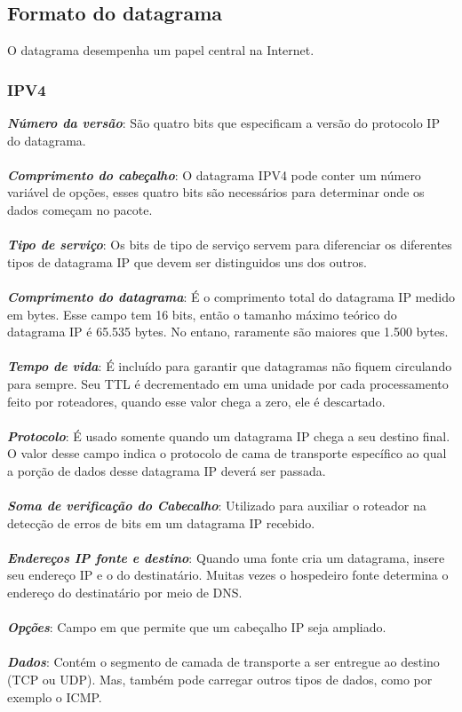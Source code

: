 \documentclass[a4paper, 12pt]{article}
\begin{document}
    \subsection{Formato do datagrama}
    O datagrama desempenha um papel central na Internet.

        \subsubsection{IPV4}
        \textbf{\textit{Número da versão}}: São quatro bits que especificam a versão do protocolo IP do datagrama.
        \\
        \\
        \textbf{\textit{Comprimento do cabeçalho}}: O datagrama IPV4 pode conter um número variável de opções, esses quatro bits
        são necessários para determinar onde os dados começam no pacote.
        \\
        \\
        \textbf{\textit{Tipo de serviço}}: Os bits de tipo de serviço servem para diferenciar os diferentes tipos de datagrama IP
        que devem ser distinguidos uns dos outros.
        \\
        \\
        \textbf{\textit{Comprimento do datagrama}}:
        É o comprimento total do datagrama IP medido em bytes. Esse campo tem 16 bits, então o tamanho máximo teórico do datagrama
        IP é 65.535 bytes. No entano, raramente são maiores que 1.500 bytes.
        \\
        \\
        \textbf{\textit{Tempo de vida}}: É incluído para garantir que datagramas não fiquem circulando para sempre. Seu TTL é 
        decrementado em uma unidade por cada processamento feito por roteadores, quando esse valor chega a zero, ele é descartado.
        \\
        \\
        \textbf{\textit{Protocolo}}: É usado somente quando um datagrama IP chega a seu destino final. O valor desse campo indica
        o protocolo de cama de transporte específico ao qual a porção de dados desse datagrama IP deverá ser passada.
        \\
        \\
        \textbf{\textit{Soma de verificação do Cabecalho}}: Utilizado para auxiliar o roteador na detecção de erros de bits em
        um datagrama IP recebido.
        \\
        \\
        \textbf{\textit{Endereços IP fonte e destino}}: Quando uma fonte cria um datagrama, insere seu endereço IP e o do destinatário.
        Muitas vezes o hospedeiro fonte determina o endereço do destinatário por meio de DNS.
        \\
        \\
        \textbf{\textit{Opções}}: Campo em que permite que um cabeçalho IP seja ampliado.
        \\
        \\
        \textbf{\textit{Dados}}: Contém o segmento de camada de transporte a ser entregue ao destino (TCP ou UDP). Mas, também pode
        carregar outros tipos de dados, como por exemplo o ICMP.
\end{document}
